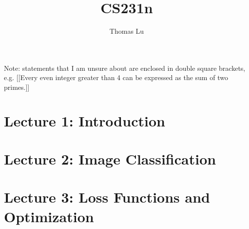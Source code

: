 \documentclass{article}
\title{CS231n}
\author{Thomas Lu}
\date{}
\begin{document}
\maketitle
Note: statements that I am unsure about are enclosed in double square brackets, e.g. [[Every even integer greater than 4 can be expressed as the sum of two primes.]]
\section{Lecture 1: Introduction}

\section{Lecture 2: Image Classification}

\section{Lecture 3: Loss Functions and Optimization}

\end{document}
